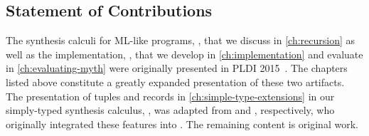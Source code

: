 \subsection{Statement of Contributions}

The synthesis calculi for ML-like programs, \mlsyn{}, that we discuss in \autoref{ch:recursion} as well as the implementation, \myth{}, that we develop in \autoref{ch:implementation} and evaluate in \autoref{ch:evaluating-myth} were originally presented in {PLDI} 2015~\citep{osera-pldi-2015}.
The chapters listed above constitute a greatly expanded presentation of these two artifacts.
The presentation of tuples and records in \autoref{ch:simple-type-extensions} in our simply-typed synthesis calculus, \lsyn{}, was adapted from \citet{frankle-mastersthesis-2015} and \citet{shah-mastersthesis-2015}, respectively, who originally integrated these features into \mlsyn{}.
The remaining content is original work.
